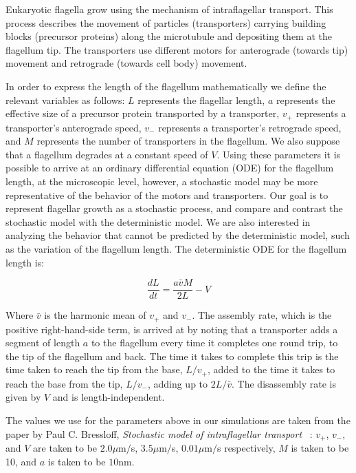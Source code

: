 Eukaryotic flagella grow using the mechanism of intraflagellar transport. This process describes the movement of particles (transporters) carrying building blocks (precursor proteins) along the microtubule and depositing them at the flagellum tip.
The transporters use different motors for anterograde (towards tip) movement and retrograde (towards cell body) movement.
~\cite{rosenbaum}

In order to express the length of the flagellum mathematically we define the relevant variables as follows:
$L$ represents the flagellar length, $a$ represents the effective size of a precursor protein transported by a transporter, $v_+$ represents a transporter's anterograde speed, $v_-$ represents a transporter's retrograde speed, and $M$ represents the number of transporters in the flagellum.
We also suppose that a flagellum degrades at a constant speed of $V$.
Using these parameters it is possible to arrive at an ordinary differential equation (ODE) for the flagellum length, at the microscopic level, however, a stochastic model may be more representative of the behavior of the motors and transporters.
Our goal is to represent flagellar growth as a stochastic process, and compare and contrast the stochastic model with the deterministic model.
We are also interested in analyzing the behavior that cannot be predicted by the deterministic model, such as the variation of the flagellum length.
The deterministic ODE for the flagellum length is:

\begin{equation*}
\frac{dL}{dt} = \frac{a \bar{v} M}{2L} - V
\end{equation*} 

Where $\bar{v}$ is the harmonic mean of $v_+$ and $v_-$.
The assembly rate, which is the positive right-hand-side term, is arrived at by noting that a transporter adds a segment of length $a$ to the flagellum every time it completes one round trip, to the tip of the flagellum and back.
The time it takes to complete this trip is the time taken to reach the tip from the base, $L/v_+$, added to the time it takes to reach the base from the tip, $L/v_-$, adding up to $2L/\bar{v}$.
The disassembly rate is given by $V$ and is length-independent.

The values we use for the parameters above in our simulations are taken from the paper by Paul C. Bressloff, \emph{Stochastic model of intraflagellar transport }~\cite{bressloff}: $v_+$, $v_-$, and $V$ are taken to be $2.0 \mu$m$/$s, $3.5 \mu$m$/$s, $0.01 \mu$m$/$s respectively, $M$ is taken to be 10, and $a$ is taken to be $10$nm.
